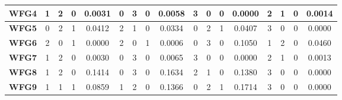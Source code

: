 \begin{table*}[t]
\begin{tabular}{c|c|c|c|c|c|c|c|c|c|c|c|c|c|c|c|c|}
\multicolumn{1}{|c|}{\textbf{WFG4}}  & 1                   & 2                     & 0                          & 0.0031          & 0                   & 3                     & 0                          & 0.0058          & 3                   & 0                     & 0                          & 0.0000          & 2                   & 1                     & 0                          & 0.0014          \\ \hline
\multicolumn{1}{|c|}{\textbf{WFG5}}  & 0                   & 2                     & 1                          & 0.0412          & 2                   & 1                     & 0                          & 0.0334          & 0                   & 2                     & 1                          & 0.0407          & 3                   & 0                     & 0                          & 0.0000          \\ \hline
\multicolumn{1}{|c|}{\textbf{WFG6}}  & 2                   & 0                     & 1                          & 0.0000          & 2                   & 0                     & 1                          & 0.0006          & 0                   & 3                     & 0                          & 0.1050          & 1                   & 2                     & 0                          & 0.0460          \\ \hline
\multicolumn{1}{|c|}{\textbf{WFG7}}  & 1                   & 2                     & 0                          & 0.0030          & 0                   & 3                     & 0                          & 0.0065          & 3                   & 0                     & 0                          & 0.0000          & 2                   & 1                     & 0                          & 0.0013          \\ \hline
\multicolumn{1}{|c|}{\textbf{WFG8}}  & 1                   & 2                     & 0                          & 0.1414          & 0                   & 3                     & 0                          & 0.1634          & 2                   & 1                     & 0                          & 0.1380          & 3                   & 0                     & 0                          & 0.0000          \\ \hline
\multicolumn{1}{|c|}{\textbf{WFG9}}  & 1                   & 1                     & 1                          & 0.0859          & 1                   & 2                     & 0                          & 0.1366          & 0                   & 2                     & 1                          & 0.1714          & 3                   & 0                     & 0                          & 0.0000          \\ \hline

\end{tabular}
\end{table*}
